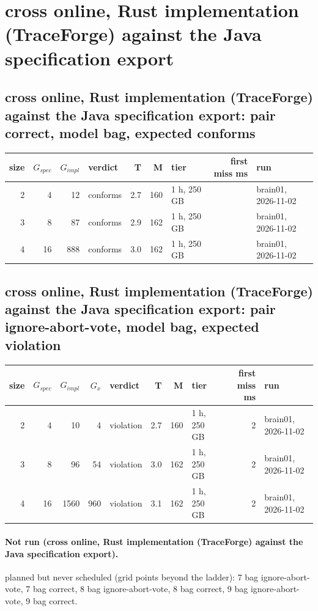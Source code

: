 \documentclass[10pt]{article}
\begin{document}
\section*{cross online, Rust implementation (TraceForge) against the Java specification export}
\subsection*{cross online, Rust implementation (TraceForge) against the Java specification export: pair \textsf{correct}, model bag, expected conforms}
\begin{longtable}{@{}rrrlrrlrl@{}}
\toprule
size & $G_{\mathit{spec}}$ & $G_{\mathit{impl}}$ & verdict & T & M & tier & first miss ms & run \\
\midrule
\endhead
\color{red} 2 & 4 & 12 & conforms & 2.7 & 160 & 1 h, 250 GB &  & brain01, 2026-11-02 \\
\color{red} 3 & 8 & 87 & conforms & 2.9 & 162 & 1 h, 250 GB &  & brain01, 2026-11-02 \\
\color{red} 4 & 16 & 888 & conforms & 3.0 & 162 & 1 h, 250 GB &  & brain01, 2026-11-02 \\
\bottomrule
\end{longtable}
\subsection*{cross online, Rust implementation (TraceForge) against the Java specification export: pair \textsf{ignore-abort-vote}, model bag, expected violation}
\begin{longtable}{@{}rrrrlrrlrl@{}}
\toprule
size & $G_{\mathit{spec}}$ & $G_{\mathit{impl}}$ & $G_x$ & verdict & T & M & tier & first miss ms & run \\
\midrule
\endhead
\color{red} 2 & 4 & 10 & 4 & violation & 2.7 & 160 & 1 h, 250 GB & 2 & brain01, 2026-11-02 \\
\color{red} 3 & 8 & 96 & 54 & violation & 3.0 & 162 & 1 h, 250 GB & 2 & brain01, 2026-11-02 \\
\color{red} 4 & 16 & 1560 & 960 & violation & 3.1 & 162 & 1 h, 250 GB & 2 & brain01, 2026-11-02 \\
\bottomrule
\end{longtable}
\paragraph{Not run (cross online, Rust implementation (TraceForge) against the Java specification export).}
planned but never scheduled (grid points beyond the ladder): 7 bag ignore-abort-vote, 7 bag correct, 8 bag ignore-abort-vote, 8 bag correct, 9 bag ignore-abort-vote, 9 bag correct.\par
\end{document}
